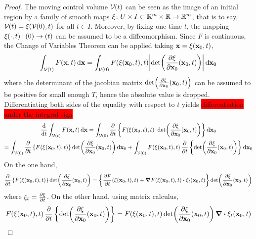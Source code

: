 \begin{proof}
	The moving control volume $\mathcal{V}_{}(t)$ can be seen as the image of an initial region by a family of smooth maps $\xi \colon U \times I \subset \mathbb{R}^m \times \mathbb{R} \rightarrow \mathbb{R}^m$, that is to say, $\mathcal{V}_{}(t) = \xi(\mathcal{V}_{}(0),t)$ for all $t \in I$. Moreover, by fixing one time $t$, the mapping $\xi(\cdot, t) \colon \vb{}(0) \rightarrow \vb{}(t)$ can be assumed to be a diffeomorphism. Since $F$ is continuous, the Change of Variables Theorem can be applied taking $\vb{x} = \xi(\vb{x}_0,t)$,
	\begin{equation*}
		\int_{\mathcal{V}(t)} F(\vb{x},t) \dd{\vb{x}} = 
		\int_{\mathcal{V}_{}(0)} F(\xi(\vb{x}_0,t), t) \abs{\det(\frac{\partial \xi}{\partial \vb{x}_0} (\vb{x}_0, t))} \dd{\vb{x}_0}
	\end{equation*}
	where the determinant of the jacobian matrix $\det(\frac{\partial \xi}{\partial \vb{x}_0} (\vb{x}_0, t))$ can be assumed to be positive for small enough $T$, hence the absolute value is dropped. Differentiating both sides of the equality with respect to $t$ yields \colorbox{red}{differentiation under the integral sign}
	\begin{multline*}
		\frac{\dd}{\dd{t}} \int_{\mathcal{V}(t)} F(\vb{x}, t) \dd{\vb{x}} = 
		\int_{\mathcal{V}_{}(0)} \pdv{t} 
		\left\{
		F(\xi(\vb{x}_0,t), t) \ \det(\frac{\partial \xi}{\partial \vb{x}_0} (\vb{x}_0, t))
		\right\}
		\dd{\vb{x}_0} 
		\\
		= 
		\int_{\mathcal{V}_{}(0)} 
		\pdv{t} \left\{ F(\xi(\vb{x}_0,t), t) \right\} \det(\frac{\partial \xi}{\partial \vb{x}_0} (\vb{x}_0, t)) \dd{\vb{x}_0} + 
		\int_{\mathcal{V}_{}(0)} F(\xi(\vb{x}_0,t), t) \, \pdv{t} \left\{ \det(\frac{\partial \xi}{\partial \vb{x}_0} (\vb{x}_0, t)) \right\} \dd{\vb{x}_0}
	\end{multline*}
	On the one hand,
	\begin{equation*}
		\pdv{t} \left\{ F(\xi(\vb{x}_0,t), t) \right\} \det(\frac{\partial \xi}{\partial \vb{x}_0} (\vb{x}_0, t)) = 
		\left\{ 
		\frac{\partial F}{\partial t} (\xi(\vb{x}_0, t), t) + 
		\grad{F(\xi(\vb{x}_0, t), t)} \vdot \xi_t (\vb{x}_0, t)
		\right\}
		\det(\frac{\partial \xi}{\partial \vb{x}_0} (\vb{x}_0, t))
	\end{equation*}
	where $\xi_t = \pdv{\xi}{t}$. On the other hand, using matrix calculus,
	\begin{equation*}
		F(\xi(\vb{x}_0,t), t) \, \pdv{t} \left\{ \det(\frac{\partial \xi}{\partial \vb{x}_0} (\vb{x}_0, t)) \right\} = 
		F(\xi(\vb{x}_0,t), t) \det(\frac{\partial \xi}{\partial \vb{x}_0} (\vb{x}_0, t)) \, \div{\xi_t(\vb{x}_0,t)}

\end{equation*}
\end{proof}
